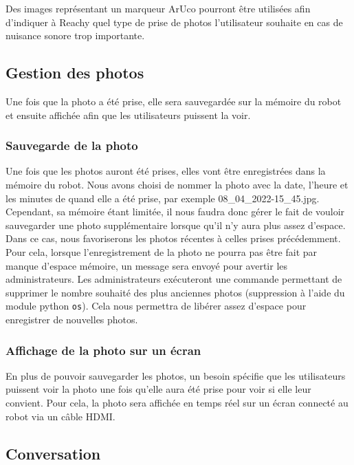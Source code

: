 Des images représentant un marqueur ArUco pourront être utilisées afin d'indiquer à Reachy quel type de prise de photos l'utilisateur souhaite en cas de nuisance sonore trop importante. 

\subsection{Gestion des photos}

Une fois que la photo a été prise, elle sera sauvegardée sur la mémoire du robot et ensuite affichée afin que les utilisateurs puissent la voir.

\subsubsection{Sauvegarde de la photo}

Une fois que les photos auront été prises, elles vont être enregistrées dans la mémoire du robot. Nous avons choisi de nommer la photo avec la date, l'heure et les minutes de quand elle a été prise, par exemple 08\_04\_2022-15\_45.jpg. Cependant, sa mémoire étant limitée, il nous faudra donc gérer le fait de vouloir sauvegarder une photo supplémentaire lorsque qu'il n'y aura plus assez d'espace. \\

Dans ce cas, nous favoriserons les photos récentes à celles prises précédemment. Pour cela, lorsque l'enregistrement de la photo ne pourra pas être fait par manque d'espace mémoire, un message sera envoyé pour avertir les administrateurs. Les administrateurs exécuteront une commande permettant de supprimer le nombre souhaité des plus anciennes photos (suppression à l'aide du module python \texttt{os}). Cela nous permettra de libérer assez d'espace pour enregistrer de nouvelles photos.

\subsubsection{Affichage de la photo sur un écran}

En plus de pouvoir sauvegarder les photos, un besoin spécifie que les utilisateurs puissent voir la photo une fois qu'elle aura été prise pour voir si elle leur convient. Pour cela, la photo sera affichée en temps réel sur un écran connecté au robot via un câble HDMI.

\subsection{Conversation} \label{subsec_conv_basique}

